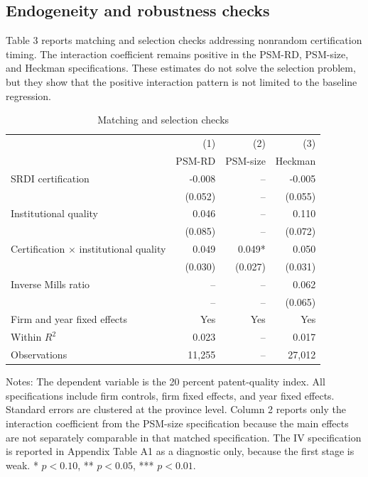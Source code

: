 \documentclass[12pt]{article}
\begin{document}
\subsection{Endogeneity and robustness checks}

Table 3 reports matching and selection checks addressing nonrandom certification timing. The interaction coefficient remains positive in the PSM-RD, PSM-size, and Heckman specifications. These estimates do not solve the selection problem, but they show that the positive interaction pattern is not limited to the baseline regression.

\begin{table}[htbp]
\centering
\caption{Matching and selection checks}
\begin{tabular}{lrrr}
\toprule
 & (1) & (2) & (3) \\
 & PSM-RD & PSM-size & Heckman \\
\midrule
SRDI certification & -0.008 & -- & -0.005 \\
 & (0.052) & -- & (0.055) \\
Institutional quality & 0.046 & -- & 0.110 \\
 & (0.085) & -- & (0.072) \\
Certification \(\times\) institutional quality & 0.049 & 0.049* & 0.050 \\
 & (0.030) & (0.027) & (0.031) \\
Inverse Mills ratio & -- & -- & 0.062 \\
 & -- & -- & (0.065) \\
Firm and year fixed effects & Yes & Yes & Yes \\
Within \(R^2\) & 0.023 & -- & 0.017 \\
Observations & 11,255 & -- & 27,012 \\
\bottomrule
\end{tabular}
\begin{minipage}{0.96\textwidth}
\footnotesize Notes: The dependent variable is the 20 percent patent-quality index. All specifications include firm controls, firm fixed effects, and year fixed effects. Standard errors are clustered at the province level. Column 2 reports only the interaction coefficient from the PSM-size specification because the main effects are not separately comparable in that matched specification. The IV specification is reported in Appendix Table A1 as a diagnostic only, because the first stage is weak. * \(p<0.10\), ** \(p<0.05\), *** \(p<0.01\).
\end{minipage}
\end{table}
\end{document}
